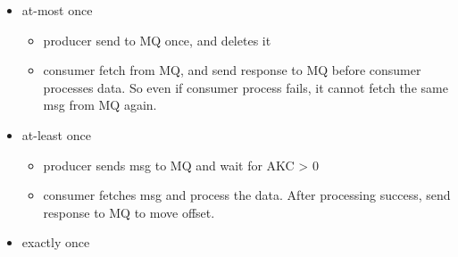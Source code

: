 \documentclass{article}
\begin{document}
\begin{itemize}
    \item at-most once\\
    \begin{itemize}
        \item producer send to MQ once, and deletes it
        \item consumer fetch from MQ, and send response to MQ before consumer processes data. So even if consumer process fails, it cannot fetch the same msg from MQ again.
    \end{itemize}
    \item at-least once
    \begin{itemize}
        \item producer sends msg to MQ and wait for AKC > 0
        \item consumer fetches msg and process the data. After processing success, send response to MQ to move offset.
    \end{itemize}
    \item exactly once
\end{itemize}
\end{document}

